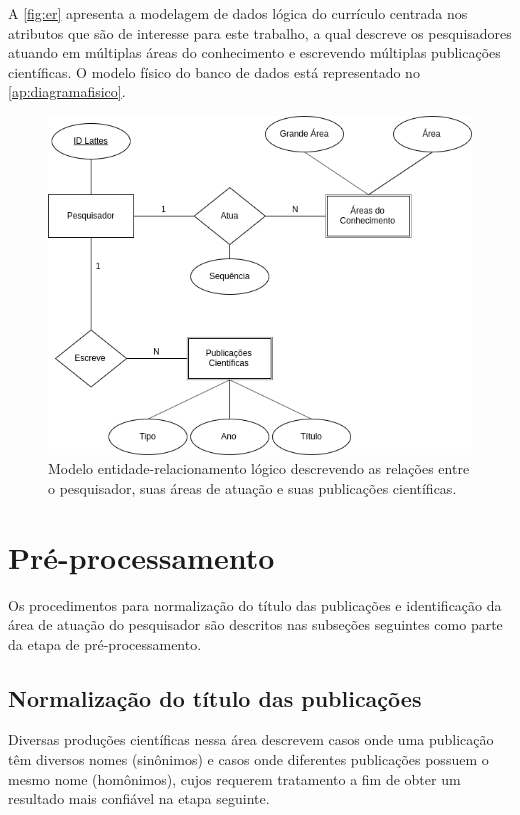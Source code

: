A \autoref{fig:er} apresenta a modelagem de dados lógica do currículo centrada nos atributos que são de interesse para este trabalho, a qual descreve os pesquisadores atuando em múltiplas áreas do conhecimento e escrevendo múltiplas publicações científicas. O modelo físico do banco de dados está representado no \autoref{ap:diagramafisico}.

\begin{figure}[htpb]
  \centering
  \includegraphics[scale=.5]{figuras/metodo-modelo-logico-lattes}
  \caption{Modelo entidade-relacionamento lógico descrevendo as relações entre o pesquisador, suas áreas de atuação e suas publicações científicas.}
  \label{fig:er}
\end{figure}

\section{Pré-processamento}

Os procedimentos para normalização do título das publicações e identificação da área de atuação do pesquisador são descritos nas subseções seguintes como parte da etapa de pré-processamento.

\subsection{Normalização do título das publicações}

Diversas produções científicas nessa área \cite{franceschet2011collaboration, mena2013prospecccao, reuther2006managing} descrevem casos onde uma publicação têm diversos nomes (sinônimos) e casos onde diferentes publicações possuem o mesmo nome (homônimos), cujos requerem tratamento a fim de obter um resultado mais confiável na etapa seguinte.

